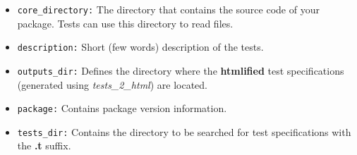 \documentclass[12pt]{article}
\begin{document}
\begin{itemize}
   \item[]{\tt core\_directory:} The directory that contains the source code of your package. Tests can use this directory to read files.
   \item[]{\tt description:} Short (few words) description of the tests.
   \item[]{\tt outputs\_dir:} Defines the directory where the {\bf htmlified} test specifications (generated using {\it tests\_2\_html}) are located.
   \item[]{\tt package:} Contains package version information.
   \item[]{\tt tests\_dir:} Contains the directory to be searched for test specifications with the {\bf .t} suffix. 
\end{itemize}
\end{document}
